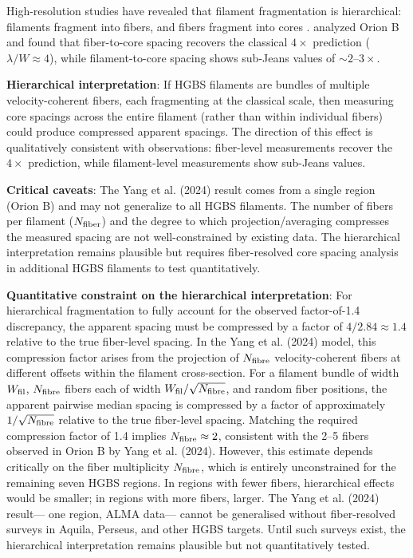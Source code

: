 \documentclass[twocolumn,longtitle,usenatbib]{mnras}
\begin{document}
High-resolution studies have revealed that filament fragmentation is hierarchical: filaments fragment into fibers, and fibers fragment into cores \citep{Hacar2013, Hacar2018}. \citet{Yang2024} analyzed Orion B and found that fiber-to-core spacing recovers the classical $4\times$ prediction ($\lambda/W \approx 4$), while filament-to-core spacing shows sub-Jeans values of $\sim2$--$3\times$.

\textbf{Hierarchical interpretation}: If HGBS filaments are bundles of multiple velocity-coherent fibers, each fragmenting at the classical scale, then measuring core spacings across the entire filament (rather than within individual fibers) could produce compressed apparent spacings. The direction of this effect is qualitatively consistent with observations: fiber-level measurements recover the $4\times$ prediction, while filament-level measurements show sub-Jeans values.

\textbf{Critical caveats}: The Yang et al. (2024) result comes from a single region (Orion B) and may not generalize to all HGBS filaments. The number of fibers per filament ($N_{\rm fiber}$) and the degree to which projection/averaging compresses the measured spacing are not well-constrained by existing data. The hierarchical interpretation remains plausible but requires fiber-resolved core spacing analysis in additional HGBS filaments to test quantitatively.

\textbf{Quantitative constraint on the hierarchical interpretation}: For hierarchical fragmentation to fully account for the observed factor-of-1.4 discrepancy, the apparent spacing must be compressed by a factor of $4/2.84 \approx 1.4$ relative to the true fiber-level spacing. In the Yang et al. (2024) model, this compression factor arises from the projection of $N_{\rm fibre}$ velocity-coherent fibers at different offsets within the filament cross-section. For a filament bundle of width $W_{\rm fil}$, $N_{\rm fibre}$ fibers each of width $W_{\rm fil}/\sqrt{N_{\rm fibre}}$, and random fiber positions, the apparent pairwise median spacing is compressed by a factor of approximately $1/\sqrt{N_{\rm fibre}}$ relative to the true fiber-level spacing. Matching the required compression factor of 1.4 implies $N_{\rm fibre} \approx 2$, consistent with the 2--5 fibers observed in Orion B by Yang et al. (2024). However, this estimate depends critically on the fiber multiplicity $N_{\rm fibre}$, which is entirely unconstrained for the remaining seven HGBS regions. In regions with fewer fibers, hierarchical effects would be smaller; in regions with more fibers, larger. The Yang et al. (2024) result— one region, ALMA data— cannot be generalised without fiber-resolved surveys in Aquila, Perseus, and other HGBS targets. Until such surveys exist, the hierarchical interpretation remains plausible but not quantitatively tested.
\end{document}
